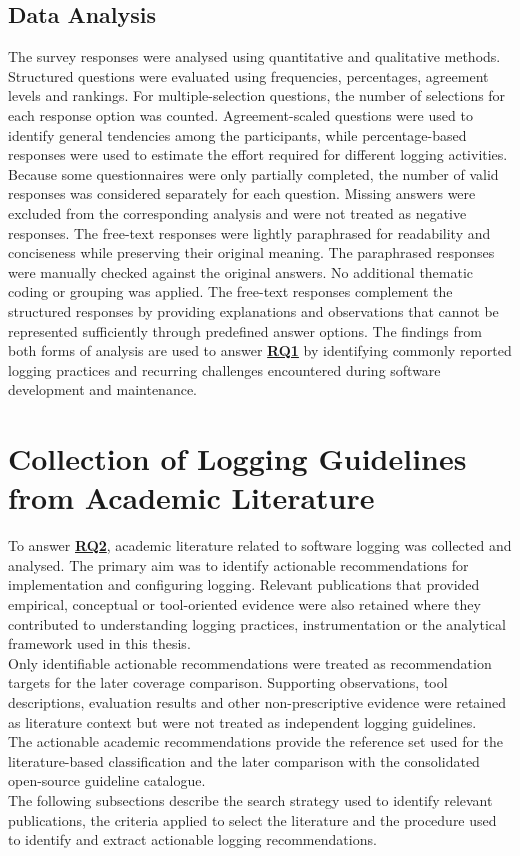 \subsection{Data Analysis}

The survey responses were analysed using quantitative and qualitative methods.
Structured questions were evaluated using frequencies, percentages, agreement levels and rankings.
For multiple-selection questions, the number of selections for each response option was counted.
Agreement-scaled questions were used to identify general tendencies among the participants,
while percentage-based responses were used to estimate the effort required for different logging activities.
Because some questionnaires were only partially completed, the number of valid responses was considered separately for each question.
Missing answers were excluded from the corresponding analysis and were not treated as negative responses.
The free-text responses were lightly paraphrased for readability and conciseness while preserving their original meaning.
The paraphrased responses were manually checked against the original answers. No additional thematic coding or grouping was applied.
The free-text responses complement the structured responses by providing explanations and observations
that cannot be represented sufficiently through predefined answer options.
The findings from both forms of analysis are used to answer \hyperref[table:t1rq]{\textbf{RQ1}}
by identifying commonly reported logging practices and recurring challenges encountered during software development and maintenance.

\section{Collection of Logging Guidelines from Academic Literature}
\label{sec:meth_collection_literature}

To answer \hyperref[table:t1rq]{\textbf{RQ2}}, academic literature related to
software logging was collected and analysed. The primary aim was to identify
actionable recommendations for implementation and configuring
logging. Relevant publications that provided empirical, conceptual or tool-oriented
evidence were also retained where they contributed to understanding logging
practices, instrumentation or the analytical framework used in this thesis.
\\
Only identifiable actionable recommendations were treated as recommendation targets
for the later coverage comparison. Supporting observations, tool descriptions,
evaluation results and other non-prescriptive evidence were retained as literature
context but were not treated as independent logging guidelines.
\\
The actionable academic recommendations provide the reference set used for the
literature-based classification and the later comparison with the consolidated
open-source guideline catalogue.
\\
The following subsections describe the search strategy used to identify relevant
publications, the criteria applied to select the literature and the procedure used to
identify and extract actionable logging recommendations.

